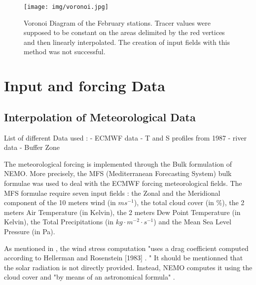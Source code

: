 \documentclass[english]{PFeENSTA}
\begin{document}
{\begin{figure}[!h]
\centering
\texttt{[image: img/voronoi.jpg]}
\caption{\label{fig:VORONOI}Voronoi Diagram of the February stations. Tracer values were supposed to be constant on the areas delimited by the red vertices and then linearly interpolated. The creation of input fields with this method was not successful.}
\end{figure}

%

\newpage 
\section{Input and forcing Data}
\subsection{Interpolation of Meteorological Data}
List of different Data used : 
- ECMWF data
- T and S profiles from 1987
- river data
- Buffer Zone



The meteorological forcing is implemented through the Bulk formulation of NEMO. More precisely, the MFS (Mediterranean Forecasting System) bulk formulae was used to deal with the ECMWF forcing meteorological fields.  
The MFS formulae require seven input fields : the Zonal and the Meridional component of the 10 meters wind (in $ms^{-1}$), the total cloud cover (in \%), the 2 meters Air Temperature (in Kelvin), the 2 meters Dew Point Temperature (in Kelvin), the Total Precipitations (in $kg\cdot m^{-2}\cdot s^{-1}$) and the Mean Sea Level Pressure (in Pa). 



As mentioned in \cite{Madec_Bk08}, the wind stress computation "uses a drag coefficient computed according to Hellerman and Rosenstein [1983] \cite{WindStress}. "
It should be mentionned that the solar radiation is not directly provided. Instead, NEMO computes  it using the cloud cover and "by means of an astronomical formula" \cite{reed1977estimating}.
 
}
\end{document}
